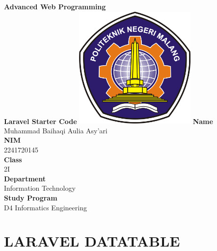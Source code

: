 \documentclass[12pt,titlepage]{article}
\newcommand{\vSubject}{Advanced Web Programming}
\newcommand{\vSubtitle}{Laravel Starter Code}
\newcommand{\vName}{Muhammad Baihaqi Aulia Asy'ari}
\newcommand{\vNIM}{2241720145}
\newcommand{\vClass}{2I}
\newcommand{\vDepartment}{Information Technology}
\newcommand{\vStudyProgram}{D4 Informatics Engineering}
\begin{document}
\begin{titlepage}
    \centering
    \vfill
    {\bfseries\LARGE
        \vSubject\\
        \vskip0.25cm
        \vSubtitle
    }
    \vfill
    \includegraphics[width=6cm]{images/polinema-logo.png}
    \vfill
    {
        \textbf{Name}\\
        \vName\\
        \vskip0.5cm
        \textbf{NIM}\\
        \vNIM\\
        \vskip0.5cm
        \textbf{Class}\\
        \vClass\\
        \vskip0.5cm
        \textbf{Department}\\
        \vDepartment\\
        \vskip0.5cm
        \textbf{Study Program}\\
        \vStudyProgram
    }
\end{titlepage}

\newpage

\section*{LARAVEL DATATABLE}
\end{document}
